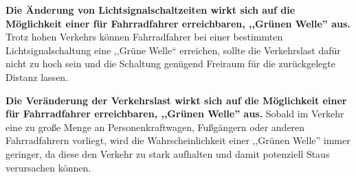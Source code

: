 \textbf{Die Änderung von Lichtsignalschaltzeiten wirkt sich auf die Möglichkeit einer für Fahrradfahrer erreichbaren, ,,Grünen Welle'' aus.}
Trotz hohen Verkehrs können Fahrradfahrer bei einer bestimmten Lichtsignalschaltung eine ,,Grüne Welle`` erreichen, sollte die Verkehrslast dafür nicht zu hoch sein und die Schaltung genügend Freiraum für die zurückgelegte Distanz lassen.

\textbf{Die Veränderung der Verkehrslast wirkt sich auf die Möglichkeit einer für Fahrradfahrer erreichbaren, ,,Grünen Welle'' aus.}
Sobald im Verkehr eine zu große Menge an Personenkraftwagen, Fußgängern oder anderen Fahrradfahrern vorliegt, wird die Wahrscheinlichkeit einer ,,Grünen Welle'' immer geringer, da diese den Verkehr zu stark aufhalten und damit potenziell Staus verursachen können.

